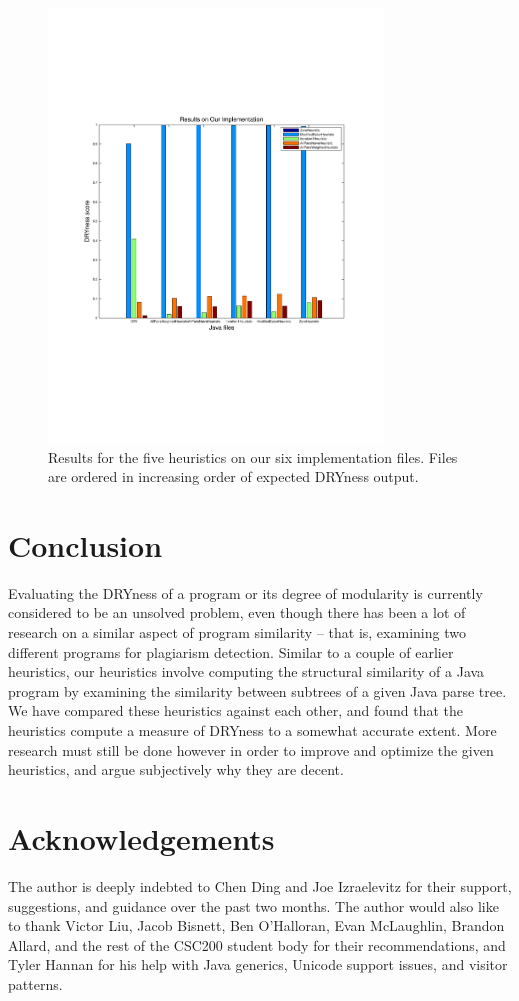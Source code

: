 \documentclass{article}
\begin{document}
\begin{figure}
\centering
\includegraphics[clip=true, trim=0.75in 2.5in 0in 2.5in, width=3.5in]{../dryPlot.pdf}
\caption{Results for the five heuristics on our six implementation files. Files are ordered in increasing order of 
expected DRYness output.}
\label{fig:dry}
\end{figure}

\section{Conclusion}

Evaluating the DRYness of a program or its degree of modularity is currently considered to be an unsolved problem,
even though there has been a lot of research on a similar aspect of program similarity -- that is, examining two
different programs for plagiarism detection. Similar to a couple of earlier heuristics, our heuristics involve
computing the structural similarity of a Java program by examining the similarity between subtrees of a given Java parse tree. 
We have compared these heuristics against each other, and found that the heuristics compute a measure of DRYness to a 
somewhat accurate extent. More research must still be done however in order to
improve and optimize the given heuristics, and argue subjectively why they are decent.

\section{Acknowledgements}

The author is deeply indebted to Chen Ding and Joe Izraelevitz for their support, suggestions, and guidance over the past two months.
The author would also like to thank Victor Liu, Jacob Bisnett, Ben O'Halloran, Evan McLaughlin, Brandon Allard, and the rest of
the CSC200 student body for their recommendations, and Tyler Hannan for his help with Java generics, Unicode support issues, and
visitor patterns.



\pagebreak
\pagestyle{empty}



\end{document}
